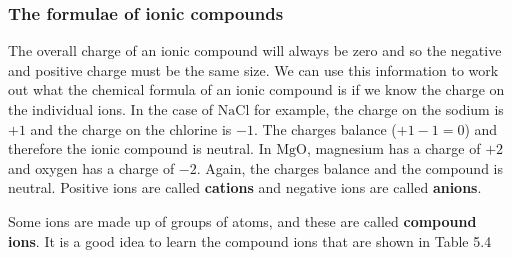             \subsubsection{ The formulae of ionic compounds}
            \nopagebreak
        \label{m38689*id144031}The overall charge of an ionic compound will always be zero and so the negative and positive charge must be the same size. We can use this information to work out what the chemical formula of an ionic compound is if we know the charge on the individual ions. In the case of $\mathrm{NaCl}$ for example, the charge on the sodium is $+1$ and the charge on the chlorine is $-1$. The charges balance ($+1-1=0$) and therefore the ionic compound is neutral. In $\mathrm{MgO}$, magnesium has a charge of $+2$ and oxygen has a charge of $-2$. Again, the charges balance and the compound is neutral. Positive ions are called \textbf{cations} and negative ions are called \textbf{anions}.\par 
        \label{m38689*id144050}Some ions are made up of groups of atoms, and these are called \textbf{compound ions}. It is a good idea to learn the compound ions that are shown in Table 5.4\par 
